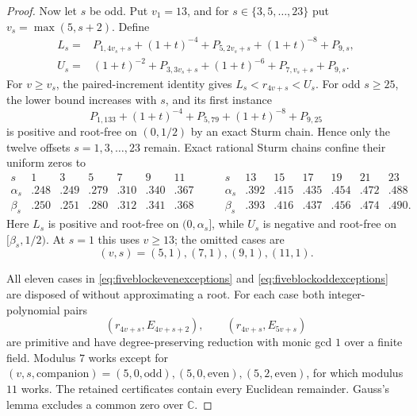 \documentclass[11pt]{article}
\theoremstyle{remark}
\newcommand{\C}{\mathbb C}
\numberwithin{equation}{section}
\begin{document}
\begin{proof}
Now let $s$ be odd.  Put $v_1=13$, and for
$s\in\{3,5,\ldots,23\}$ put $v_s=\max(5,s+2)$.  Define
\begin{align*}
 L_s={}&P_{1,4v_s+s}+(1+t)^{-4}+P_{5,2v_s+s}
                         +(1+t)^{-8}+P_{9,s},\\
 U_s={}&(1+t)^{-2}+P_{3,3v_s+s}+(1+t)^{-6}
                         +P_{7,v_s+s}+P_{9,s}.
\end{align*}
For $v\ge v_s$, the paired-increment identity gives
$L_s<r_{4v+s}<U_s$.  For odd $s\ge25$, the lower bound increases with $s$,
and its first instance
\[
 P_{1,133}+(1+t)^{-4}+P_{5,79}+(1+t)^{-8}+P_{9,25}
\]
is positive and root-free on $(0,1/2)$ by an exact Sturm chain.  Hence only
the twelve offsets $s=1,3,\ldots,23$ remain.  Exact rational Sturm chains
confine their uniform zeros to
\[
\begin{array}{c|cccccc}
s&1&3&5&7&9&11\\ \hline
\alpha_s&.248&.249&.279&.310&.340&.367\\
\beta_s &.250&.251&.280&.312&.341&.368
\end{array}
\qquad
\begin{array}{c|cccccc}
s&13&15&17&19&21&23\\ \hline
\alpha_s&.392&.415&.435&.454&.472&.488\\
\beta_s &.393&.416&.437&.456&.474&.490.
\end{array}
\]
Here $L_s$ is positive and root-free on $(0,\alpha_s]$, while $U_s$ is
negative and root-free on $[\beta_s,1/2)$.  At $s=1$ this uses $v\ge13$;
the omitted cases are
\begin{equation}\label{eq:fiveblockoddexceptions}
 (v,s)=(5,1),(7,1),(9,1),(11,1).
\end{equation}

All eleven cases in \eqref{eq:fiveblockevenexceptions} and
\eqref{eq:fiveblockoddexceptions} are disposed of without approximating a
root.  For each case both integer-polynomial pairs
\[
 (r_{4v+s},E_{4v+s+2}),\qquad (r_{4v+s},E_{5v+s})
\]
are primitive and have degree-preserving reduction with monic gcd $1$ over a
  finite field.  Modulus $7$ works except for
  $(v,s,\mathrm{companion})=(5,0,\mathrm{odd}),
  (5,0,\mathrm{even}),(5,2,\mathrm{even})$, for which modulus $11$ works.
  The retained certificates contain every Euclidean remainder.
Gauss's lemma excludes a common zero over $\C$.


\end{proof}
\end{document}
